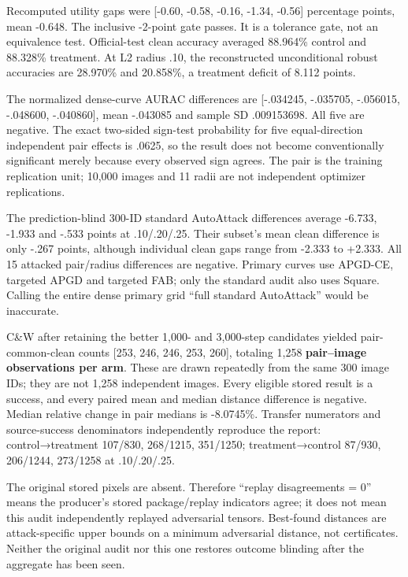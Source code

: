 \documentclass[
  british,
  10pt,
  a4paper,
]{article}
\begin{document}
Recomputed utility gaps were {[}-0.60, -0.58, -0.16, -1.34, -0.56{]}
percentage points, mean -0.648. The inclusive -2-point gate passes. It
is a tolerance gate, not an equivalence test. Official-\allowbreak{}test
clean accuracy averaged 88.964\% control and 88.328\% treatment. At L2
radius .10, the reconstructed unconditional robust accuracies are
28.970\% and 20.858\%, a treatment deficit of 8.112 points.

The normalized dense-\allowbreak{}curve AURAC differences are
{[}-.034245, -.035705, -.056015, -.048600, -.040860{]}, mean -.043085
and sample SD .\allowbreak{}009153698.\allowbreak{} All five are
negative. The exact two-sided sign-test probability for five
equal-\allowbreak{}direction independent pair effects is .0625, so the
result does not become conventionally significant merely because every
observed sign agrees. The pair is the training replication unit; 10,000
images and 11 radii are not independent optimizer
replications\allowbreak{}.\allowbreak{}

The prediction-\allowbreak{}blind 300-ID standard AutoAttack differences
average -6.733, -1.933 and -.533 points at
.\allowbreak{}10/\allowbreak{}.\allowbreak{}20/\allowbreak{}.\allowbreak{}25.\allowbreak{}
Their subset's mean clean difference is only -.267 points, although
individual clean gaps range from -2.333 to +2.333. All 15 attacked
pair/\allowbreak{}radius differences are negative. Primary curves use
APGD-CE, targeted APGD and targeted FAB; only the standard audit also
uses Square. Calling the entire dense primary grid ``full standard
AutoAttack'' would be inaccurate.\allowbreak{}

C\&W after retaining the better 1,000- and 3,000-step candidates yielded
pair-\allowbreak{}common-\allowbreak{}clean counts {[}253, 246, 246,
253, 260{]}, totaling 1,258 \textbf{pair--image observations per arm}.
These are drawn repeatedly from the same 300 image IDs; they are not
1,258 independent images. Every eligible stored result is a success, and
every paired mean and median distance difference is negative. Median
relative change in pair medians is -8.0745\%. Transfer numerators and
source-\allowbreak{}success denominators independently reproduce the
report: control→treatment 107/830, 268/1215, 351/1250; treatment→control
87/930, 206/1244, 273/1258 at
.\allowbreak{}10/\allowbreak{}.\allowbreak{}20/\allowbreak{}.\allowbreak{}25.\allowbreak{}

The original stored pixels are absent. Therefore ``replay disagreements
= 0'' means the producer's stored package/\allowbreak{}replay indicators
agree; it does not mean this audit independently replayed adversarial
tensors. Best-found distances are attack-\allowbreak{}specific upper
bounds on a minimum adversarial distance, not
certificates\allowbreak{}.\allowbreak{} Neither the original audit nor
this one restores outcome blinding after the aggregate has been seen.
\end{document}
